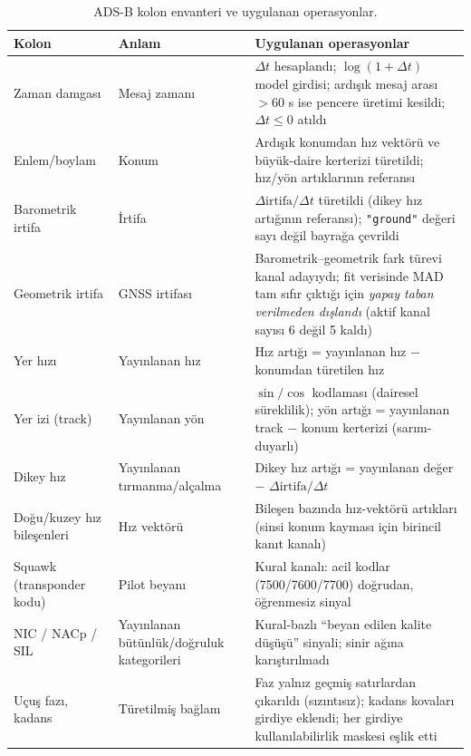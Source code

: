 \documentclass[11pt,a4paper]{article}
\begin{document}
\begin{table}[h]
\centering\small
\caption{ADS-B kolon envanteri ve uygulanan operasyonlar.}
\label{tab:adsb-kolon}
\begin{tabular}{p{3.4cm}p{3.4cm}p{7.4cm}}
\toprule
Kolon & Anlam & Uygulanan operasyonlar \\
\midrule
Zaman damgası & Mesaj zamanı & $\Delta t$ hesaplandı; $\log(1+\Delta t)$ model
girdisi; ardışık mesaj arası $> 60$ s ise pencere üretimi kesildi; $\Delta t
\leq 0$ atıldı \\
\addlinespace[2pt]
Enlem/boylam & Konum & Ardışık konumdan hız vektörü ve büyük-daire kerterizi
türetildi; hız/yön artıklarının referansı \\
\addlinespace[2pt]
Barometrik irtifa & İrtifa & $\Delta\text{irtifa}/\Delta t$ türetildi (dikey hız
artığının referansı); \texttt{"ground"} değeri sayı değil bayrağa çevrildi \\
\addlinespace[2pt]
Geometrik irtifa & GNSS irtifası & Barometrik--geometrik fark türevi kanal adayıydı;
fit verisinde MAD tam sıfır çıktığı için \emph{yapay taban verilmeden dışlandı}
(aktif kanal sayısı 6 değil 5 kaldı) \\
\addlinespace[2pt]
Yer hızı & Yayınlanan hız & Hız artığı = yayınlanan hız $-$ konumdan türetilen
hız \\
\addlinespace[2pt]
Yer izi (track) & Yayınlanan yön & $\sin/\cos$ kodlaması (dairesel süreklilik);
yön artığı = yayınlanan track $-$ konum kerterizi (sarım-duyarlı) \\
\addlinespace[2pt]
Dikey hız & Yayınlanan tırmanma/alçalma & Dikey hız artığı = yayınlanan değer $-$
$\Delta\text{irtifa}/\Delta t$ \\
\addlinespace[2pt]
Doğu/kuzey hız bileşenleri & Hız vektörü & Bileşen bazında hız-vektörü artıkları
(sinsi konum kayması için birincil kanıt kanalı) \\
\addlinespace[2pt]
Squawk (transponder kodu) & Pilot beyanı & Kural kanalı: acil kodlar
(7500/7600/7700) doğrudan, öğrenmesiz sinyal \\
\addlinespace[2pt]
NIC / NACp / SIL & Yayınlanan bütünlük/doğruluk kategorileri & Kural-bazlı
``beyan edilen kalite düşüşü'' sinyali; sinir ağına karıştırılmadı \\
\addlinespace[2pt]
Uçuş fazı, kadans & Türetilmiş bağlam & Faz yalnız geçmiş satırlardan çıkarıldı
(sızıntısız); kadans kovaları girdiye eklendi; her girdiye kullanılabilirlik
maskesi eşlik etti \\
\bottomrule
\end{tabular}
\end{table}
\end{document}
